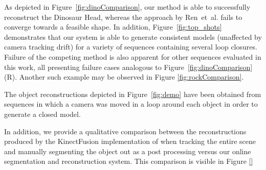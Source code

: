 As depicted in Figure~\ref{fig:dinoComparison}, our method is able to successfully reconstruct the Dinosaur Head, whereas the approach by Ren~et~al. fails to converge towards a feasible shape.
In addition, Figure~\ref{fig:top_shots} demonstrates that our system is able to generate consistent models (unaffected by camera tracking drift) for a variety of sequences containing several loop closures.
Failure of the competing method %
is also apparent for other sequences evaluated in this work, all presenting failure cases analogous to Figure~\ref{fig:dinoComparison}(R). %
Another such example may be observed in Figure \ref{fig:rockComparison}.

The object reconstructions depicted in Figure~\ref{fig:demo} have been obtained from sequences in which a camera was moved in a loop around each object in order to generate a closed model.

In addition, we provide a qualitative comparison between the reconstructions produced by the KinectFusion implementation of \cite{Prisacariu2014} when 
tracking the entire scene and manually segmenting the object out as a post processing versus our online segmentation and reconstruction system. This 
comparison is visible in Figure \ref{}

